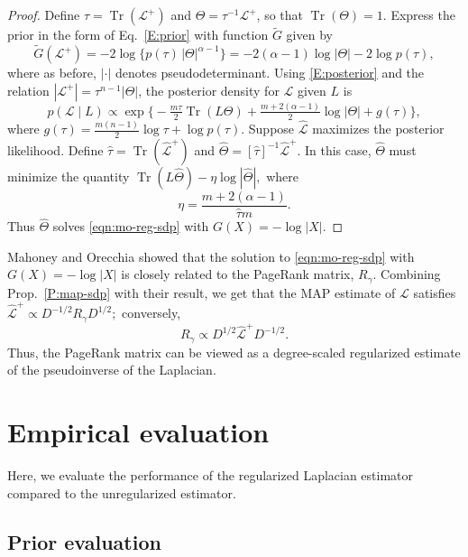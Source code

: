 \documentclass[12pt]{article}
\DeclareMathOperator*{\Tr}{Tr}
\theoremstyle{plain}
\begin{document}
\begin{proof}
Define $\tau = \Tr(\mathcal{L}^+)$ and $\Theta  = \tau^{-1}
\mathcal{L}^+$, so that $\Tr(\Theta) = 1$.
Express the prior in the form of Eq.~\eqref{E:prior} with function
$\tilde G$ given by
\[
  \tilde G(\mathcal{L}^+)
    = -2 \log \{ p(\tau) \, |\Theta|^{\alpha - 1} \}
    = -2(\alpha - 1) \log |\Theta| - 2 \log p(\tau),
\]
where as before, $|\cdot|$ denotes pseudodeterminant.  Using
\eqref{E:posterior} and the relation
$|\mathcal{L}^+| = \tau^{n-1} |\Theta|$, the posterior
density for $\mathcal{L}$ given $L$ is
\[
  p(\mathcal{L} \mid L)
    \propto
      \exp\Big\{
        -\tfrac{m \tau}{2} \Tr(L \Theta)
        +\tfrac{m + 2(\alpha - 1)}{2} \log | \Theta |
        + g(\tau)\Big\},
\]
where
\(
  g(\tau)
    = \tfrac{m (n-1)}{2} \log \tau
        + \log p(\tau).
\)
Suppose $\mathcal{\hat L}$ maximizes the
posterior likelihood.  Define $\hat \tau = \Tr(\mathcal{\hat L}^+)$
and $\hat \Theta = [\hat \tau]^{-1} \mathcal{\hat L}^{+}$.
In this case, $\hat \Theta$ must minimize the quantity
\(
  \Tr(L \hat \Theta) - \eta \log |\hat \Theta|,
\)
where
\begin{equation}\label{E:eta}
  \eta
    = \frac{m + 2(\alpha - 1)}{\hat \tau m}.
\end{equation}
Thus $\hat \Theta$ solves \eqref{eqn:mo-reg-sdp} with $G(X) = - \log |X|$.
\end{proof}

Mahoney and Orecchia showed that the solution to
\eqref{eqn:mo-reg-sdp} with $G(X) = - \log |X|$
is closely related to the PageRank matrix, $R_\gamma$.  Combining
Prop.~\ref{P:map-sdp} with their result, we get that the MAP estimate
of $\mathcal{L}$ satisfies
\(
  \mathcal{\hat L}^+
    \propto D^{-1/2} R_\gamma D^{1/2};
\)
conversely,
\[
  R_\gamma
    \propto
      D^{1/2} \mathcal{\hat L}^+ D^{-1/2}.
\]
Thus, the PageRank matrix
can be viewed as a degree-scaled regularized estimate of the
pseudoinverse of the Laplacian.


\section{Empirical evaluation}
\label{sxn:empirical}

Here, we evaluate the performance of the regularized Laplacian
estimator compared to the unregularized estimator.

\subsection{Prior evaluation}\label{S:prior-evaluation}
\end{document}
